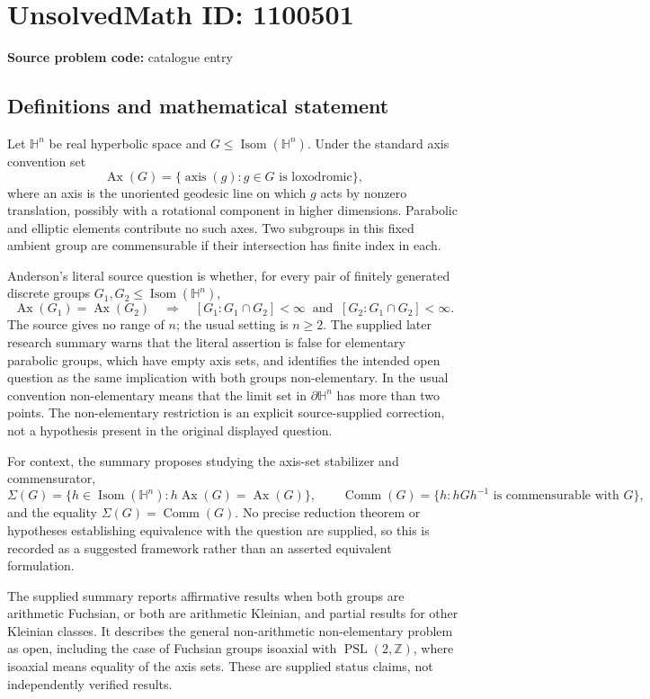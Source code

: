 \documentclass[11pt]{article}
\newcommand{\Z}{\mathbb{Z}}
\begin{document}
\section*{UnsolvedMath ID: 1100501}
\textbf{Source problem code:} catalogue entry
\subsection{Definitions and mathematical statement}
Let $\mathbb H^n$ be real hyperbolic space and $G\le\operatorname{Isom}(\mathbb H^n)$. Under the standard axis convention set
\[
\operatorname{Ax}(G)=\{\operatorname{axis}(g):g\in G\text{ is loxodromic}\},
\]
where an axis is the unoriented geodesic line on which $g$ acts by nonzero translation, possibly with a rotational component in higher dimensions. Parabolic and elliptic elements contribute no such axes. Two subgroups in this fixed ambient group are commensurable if their intersection has finite index in each.

Anderson's literal source question is whether, for every pair of finitely generated discrete groups $G_1,G_2\le\operatorname{Isom}(\mathbb H^n)$,
\[
\operatorname{Ax}(G_1)=\operatorname{Ax}(G_2)
\quad\Longrightarrow\quad
[G_1:G_1\cap G_2]<\infty\ \text{ and }\ [G_2:G_1\cap G_2]<\infty.
\]
The source gives no range of $n$; the usual setting is $n\ge2$. The supplied later research summary warns that the literal assertion is false for elementary parabolic groups, which have empty axis sets, and identifies the intended open question as the same implication with both groups non-elementary. In the usual convention non-elementary means that the limit set in $\partial\mathbb H^n$ has more than two points. The non-elementary restriction is an explicit source-supplied correction, not a hypothesis present in the original displayed question.

For context, the summary proposes studying the axis-set stabilizer and commensurator,
\[
\Sigma(G)=\{h\in\operatorname{Isom}(\mathbb H^n):h\operatorname{Ax}(G)=\operatorname{Ax}(G)\},\qquad
\operatorname{Comm}(G)=\{h:hGh^{-1}\text{ is commensurable with }G\},
\]
and the equality $\Sigma(G)=\operatorname{Comm}(G)$. No precise reduction theorem or hypotheses establishing equivalence with the question are supplied, so this is recorded as a suggested framework rather than an asserted equivalent formulation.

The supplied summary reports affirmative results when both groups are arithmetic Fuchsian, or both are arithmetic Kleinian, and partial results for other Kleinian classes. It describes the general non-arithmetic non-elementary problem as open, including the case of Fuchsian groups isoaxial with $\operatorname{PSL}(2,\Z)$, where isoaxial means equality of the axis sets. These are supplied status claims, not independently verified results.
\end{document}
